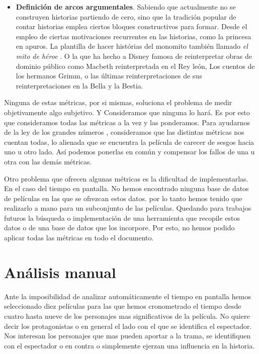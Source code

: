 \begin{itemize}
        \item \textbf{Definición de arcos argumentales}. Sabiendo que actualmente no se construyen historias partiendo de cero, sino que la tradición popular de contar historias emplea ciertos bloques constructivos para formar. Desde el empleo de ciertas motivaciones recurrentes en las historias, como la princesa en apuros. La plantilla de hacer histórias del monomito también llamado \textit{el mito de héroe} \cite{campbell1989hero}. O la que ha hecho a Disney famosa de reinterpretar obras de dominio público como Macbeth reinterpretada en el Rey león, Los cuentos de los hermanos Grimm, o las últimas reinterpretaciones de sus reinterpretaciones en la Bella y la Bestia.
    \end{itemize}
    
    Ninguna de estas métricas, por si mismas, soluciona el problema de medir objetivamente algo subjetivo. Y Consideramos que ninguna lo hará. Es por esto que consideramos todas las métricas a la vez y las ponderamos. Para ayudarnos de la ley de los grandes números \cite{LeyDeGrandesNumeros}, consideramos que las distintas métricas nos cuentan todas, lo alienada que se encuentra la película de carecer de sesgos hacia uno u otro lado. Así podemos ponerlas en común y compensar los fallos de una u otra con las demás métricas.
    
    Otro problema que ofrecen algunas métricas es la dificultad de implementarlas. En el caso del tiempo en pantalla. No hemos encontrado ninguna base de datos de películas en las que se ofrezcan estos datos. por lo tanto hemos tenido que realizarlo a mano para un subconjunto de las películas. Quedando para trabajos futuros la búsqueda o implementación de una herramienta que recopile estos datos o de una base de datos que los incorpore. Por esto, no hemos podido aplicar todas las métricas en todo el documento.


\section{Análisis manual}
    Ante la imposibilidad de analizar automáticamente el tiempo en pantalla hemos seleccionado diez películas para las que hemos cronometrado el tiempo desde cuatro hasta nueve de los personajes mas significativos de la película. No quiere decir los protagonistas o en general el lado con el que se identifica el espectador. Nos interesan los personajes que mas pueden aportar a la trama, se identifiquen con el espectador o en contra o simplemente ejerzan una influencia en la historia.
